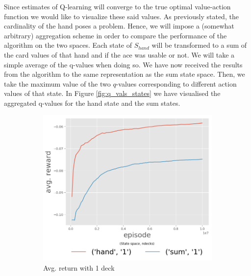 Since estimates of Q-learning will converge to the true optimal value-action function we would like to visualize these said values. As previously stated, the cardinality of the hand poses a problem. Hence, we will impose a (somewhat arbitrary) aggregation scheme in order to compare the performance of the algorithm on the two spaces. Each state of $S_{hand}$ will be transformed to a sum of the card values of that hand and if the ace was usable or not. We will take a simple average of the q-values when doing so. We have now received the results from the algorithm to the same representation as the sum state space. Then, we take the maximum value of the two $q$-values corresponding to different action values of that state. In Figure \ref{fig:q_vals_states} we have visualised the aggregated q-values for the hand state and the sum states.
\begin{figure}[htp]
\centering
 \begin{subfigure}[b]{0.48\textwidth}
  	 \includegraphics[width=\textwidth]{./figures/avgReturnEp_ndeck1.png}
   \caption{Avg. return with 1 deck\label{sfig:3Dfignd6}}
 \end{subfigure}
 \begin{subfigure}[b]{0.48\textwidth}

\end{subfigure}
\end{figure}

